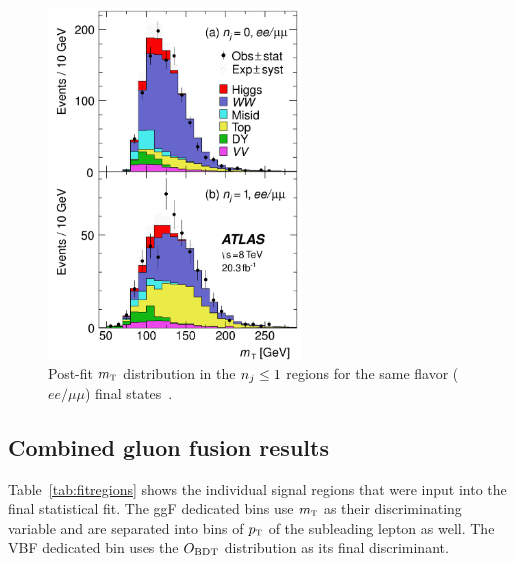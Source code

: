 \begin{figure}[h!]
  \centering
  \captionsetup{justification=centering}

  \includegraphics[width=0.6\textwidth]{figures/ggF_mT_sameflavor}
  \caption{Post-fit $m_{\textrm{\footnotesize\sc t}}$ distribution in the $n_j \leq 1$ regions for the same flavor ($ee/\mu\mu$) final states~\cite{WW2015}.}
  \label{fig:ggF_mT_sf}
\end{figure}

\subsection{Combined gluon fusion results}

Table~\ref{tab:fitregions} shows the individual signal regions that were input into the final statistical fit. The ggF dedicated bins use $m_{\textrm{\footnotesize\sc t}}$ as their discriminating variable and are separated into bins of $p_{\textrm{\footnotesize\sc t}}$ of the subleading lepton as well. The VBF dedicated bin uses the $O_{\rm BDT}$ distribution as its final discriminant. 

